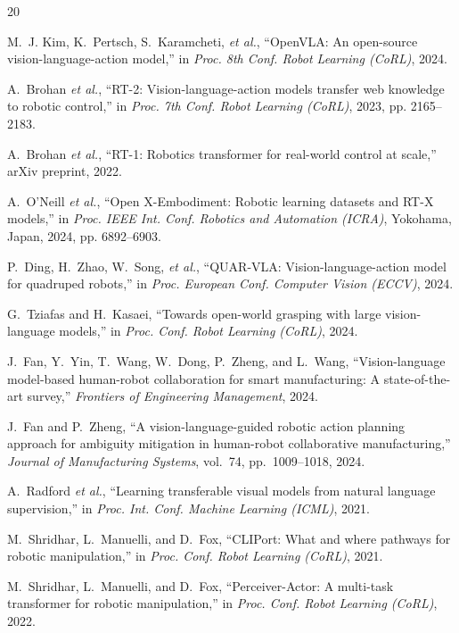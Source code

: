 \documentclass[conference]{IEEEtran}
\begin{document}
\begin{thebibliography}{20}

M.~J. Kim, K.~Pertsch, S.~Karamcheti, \emph{et al.},
``OpenVLA: An open-source vision-language-action model,''
in \emph{Proc. 8th Conf. Robot Learning (CoRL)}, 2024.

A.~Brohan \emph{et al.},
``RT-2: Vision-language-action models transfer web knowledge to robotic
control,''
in \emph{Proc. 7th Conf. Robot Learning (CoRL)}, 2023, pp. 2165--2183.

A.~Brohan \emph{et al.},
``RT-1: Robotics transformer for real-world control at scale,''
arXiv preprint, 2022.

A.~O'Neill \emph{et al.},
``Open X-Embodiment: Robotic learning datasets and RT-X models,''
in \emph{Proc. IEEE Int. Conf. Robotics and Automation (ICRA)},
Yokohama, Japan, 2024, pp. 6892--6903.

P.~Ding, H.~Zhao, W.~Song, \emph{et al.},
``QUAR-VLA: Vision-language-action model for quadruped robots,''
in \emph{Proc. European Conf. Computer Vision (ECCV)}, 2024.

G.~Tziafas and H.~Kasaei,
``Towards open-world grasping with large vision-language models,''
in \emph{Proc. Conf. Robot Learning (CoRL)}, 2024.

J.~Fan, Y.~Yin, T.~Wang, W.~Dong, P.~Zheng, and L.~Wang,
``Vision-language model-based human-robot collaboration for smart
manufacturing: A state-of-the-art survey,''
\emph{Frontiers of Engineering Management}, 2024.

J.~Fan and P.~Zheng,
``A vision-language-guided robotic action planning approach for ambiguity
mitigation in human-robot collaborative manufacturing,''
\emph{Journal of Manufacturing Systems}, vol.~74, pp.~1009--1018, 2024.

A.~Radford \emph{et al.},
``Learning transferable visual models from natural language
supervision,''
in \emph{Proc. Int. Conf. Machine Learning (ICML)}, 2021.

M.~Shridhar, L.~Manuelli, and D.~Fox,
``CLIPort: What and where pathways for robotic manipulation,''
in \emph{Proc. Conf. Robot Learning (CoRL)}, 2021.

M.~Shridhar, L.~Manuelli, and D.~Fox,
``Perceiver-Actor: A multi-task transformer for robotic manipulation,''
in \emph{Proc. Conf. Robot Learning (CoRL)}, 2022.


\end{thebibliography}
\end{document}
